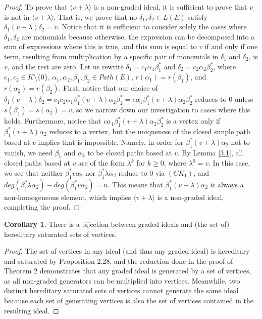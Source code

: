 \documentclass[12pt]{amsart}
\theoremstyle{plain} \numberwithin{equation}{section}
\theoremstyle{definition}
\newtheorem{cor}[theorem]{Corollary}
\theoremstyle{definition}
\begin{document}
\begin{proof}
To prove that $\langle v+\lambda\rangle$ is a non-graded ideal, it is sufficient to prove that $v$ is not in $\langle v+\lambda\rangle$. That is, we prove that no $\delta_1,\delta_2\in L(E)$ satisfy $\delta_1 (v+\lambda) \delta_2 = v$. Notice that it is sufficient to consider solely the cases where $\delta_1,\delta_2$ are monomials because otherwise, the expression can be decomposed into a sum of expressions where this is true, and this sum is equal to $v$ if and only if one term, resulting from multiplication by a specific pair of monomials in $\delta_1$ and $\delta_2$, is $v$, and the rest are zero. Let us rewrite $\delta_1 = c_1\alpha_1\beta_1^*$ and $\delta_2 = c_2\alpha_2\beta_2^*$, where $c_1,c_2\in K\setminus\{0\}$, $\alpha_1,\alpha_2,\beta_1,\beta_2\in Path(E)$, $r(\alpha_1) = r(\beta_1)$, and $r(\alpha_2) = r(\beta_2)$. First, notice that our choice of $\delta_1(v+\lambda)\delta_2 = c_1c_2\alpha_1\beta_1^*(v+\lambda)\alpha_2\beta_2^* = c\alpha_1\beta_1^*(v+\lambda)\alpha_2\beta_2^*$ reduces to $0$ unless $s(\beta_1) = s(\alpha_2) = v$, so we narrow down our investigation to cases where this holds. Furthermore, notice that $c\alpha_1\beta_1^*(v+\lambda)\alpha_2\beta_2^*$ is a vertex only if $\beta_1^*(v+\lambda)\alpha_2$ reduces to a vertex, but the uniqueness of the closed simple path based at $v$ implies that is impossible. Namely, in order for $\beta_1^*(v+\lambda)\alpha_2$ not to vanish, we need $\beta_1$ and $\alpha_2$ to be closed paths based at $v$. By Lemma \ref{3.1}, all closed paths based at $v$ are of the form $\lambda^k$ for $k\geq0$, where $\lambda^0 = v$. In this case, we see that neither $\beta_1^*v\alpha_2$ nor $\beta_1^*\lambda\alpha_2$ reduce to 0 via $(CK_1)$, and $deg(\beta_1^*\lambda\alpha_2) - deg(\beta_1^*v\alpha_2) = n$. This means that $\beta_1^*(v+\lambda)\alpha_2$ is always a non-homogeneous element, which implies $\langle v+\lambda\rangle$ is a non-graded ideal, completing the proof. \end{proof} 

\begin{cor}
    There is a bijection between graded ideals and (the set of) hereditary saturated sets of vertices.
\end{cor}
\begin{proof}
    The set of vertices in any ideal (and thus any graded ideal) is hereditary and saturated by Proposition 2.28, and the reduction done in the proof of Theorem 2 demonstrates that any graded ideal is generated by a set of vertices, as all non-graded generators can be multiplied into vertices. Meanwhile, two distinct hereditary saturated sets of vertices cannot generate the same ideal because each set of generating vertices is also the set of vertices contained in the resulting ideal. 
\end{proof}
\end{document}
